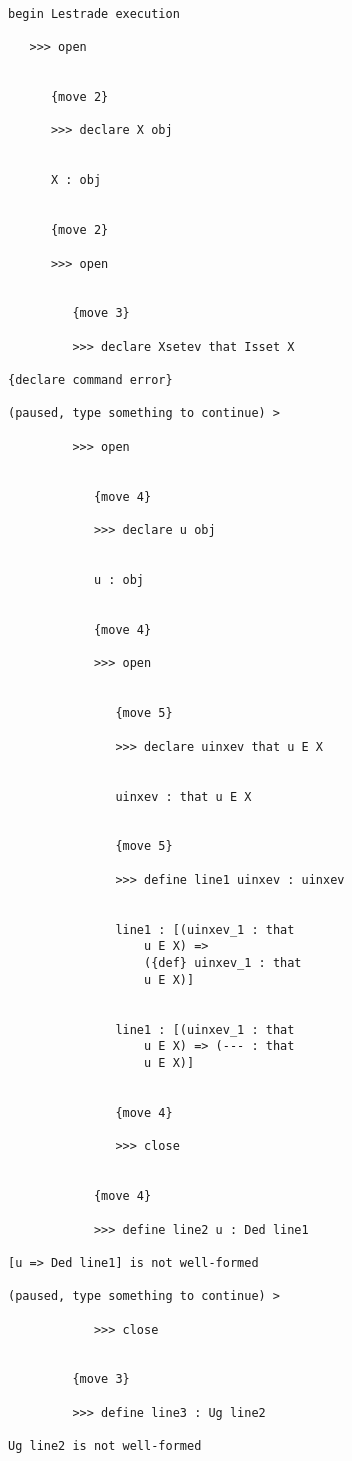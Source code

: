 \documentclass[12pt]{article}
\begin{document}
\begin{verbatim}

begin Lestrade execution

   >>> open


      {move 2}

      >>> declare X obj


      X : obj


      {move 2}

      >>> open


         {move 3}

         >>> declare Xsetev that Isset X

{declare command error}

(paused, type something to continue) >

         >>> open


            {move 4}

            >>> declare u obj


            u : obj


            {move 4}

            >>> open


               {move 5}

               >>> declare uinxev that u E X


               uinxev : that u E X


               {move 5}

               >>> define line1 uinxev : uinxev


               line1 : [(uinxev_1 : that 
                   u E X) => 
                   ({def} uinxev_1 : that 
                   u E X)]


               line1 : [(uinxev_1 : that 
                   u E X) => (--- : that 
                   u E X)]


               {move 4}

               >>> close


            {move 4}

            >>> define line2 u : Ded line1

[u => Ded line1] is not well-formed

(paused, type something to continue) >

            >>> close


         {move 3}

         >>> define line3 : Ug line2

Ug line2 is not well-formed


\end{verbatim}
\end{document}
